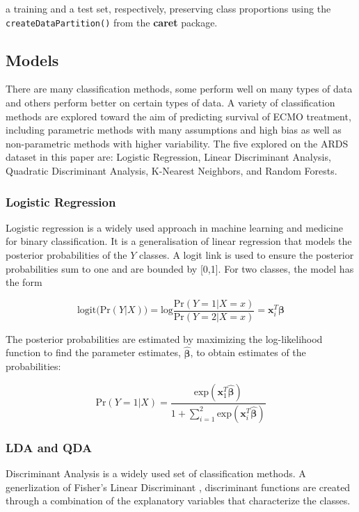 \documentclass[12pt,]{article}
\begin{document}
a training and a test set, respectively, preserving class proportions
using the \texttt{createDataPartition()} from the \textbf{caret}
package.

\subsection{Models}\label{models}

There are many classification methods, some perform well on many types
of data and others perform better on certain types of data. A variety of
classification methods are explored toward the aim of predicting
survival of ECMO treatment, including parametric methods with many
assumptions and high bias as well as non-parametric methods with higher
variability. The five explored on the ARDS dataset in this paper are:
Logistic Regression, Linear Discriminant Analysis, Quadratic
Discriminant Analysis, K-Nearest Neighbors, and Random Forests.

\subsubsection{Logistic Regression}\label{logistic-regression}

Logistic regression is a widely used approach in machine learning and
medicine for binary classification. It is a generalisation of linear
regression that models the posterior probabilities of the \(Y\) classes.
A logit link is used to ensure the posterior probabilities sum to one
and are bounded by {[}0,1{]}. For two classes, the model has the form

\[
\text{logit} \Big( \text{Pr}(Y \vert X) \Big) = \text{log} \frac{ \text{Pr}(Y=1 \vert X=x) }{ \text{Pr}(Y=2 \vert X=x) }  = \mathbf{x}^T_i\boldsymbol{\beta}  
\]

The posterior probabilities are estimated by maximizing the
log-likelihood function to find the parameter estimates,
\(\hat{\boldsymbol{\beta}}\), to obtain estimates of the probabilities:

\[
\text{Pr}(Y=1 \vert X) = \frac{ \text{exp}(\mathbf{x}^T_1 \hat{\boldsymbol{\beta}}) }{ 1 + \sum^2_{i=1} \text{exp}(\mathbf{x}^T_i \hat{\boldsymbol{\beta}}) }
\]

\subsubsection{LDA and QDA}\label{lda-and-qda}

Discriminant Analysis is a widely used set of classification methods. A
generlization of Fisher's Linear Discriminant \citep{fisher_use_1936},
discriminant functions are created through a combination of the
explanatory variables that characterize the classes.
\end{document}
